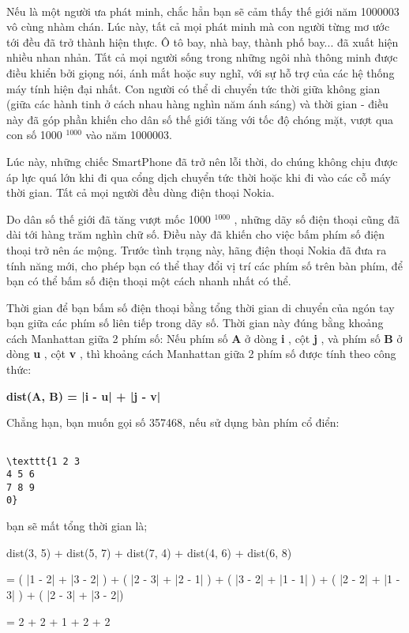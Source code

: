  

Nếu là một người ưa phát minh, chắc hẳn bạn sẽ cảm thấy thế giới năm 1000003 vô cùng nhàm chán. Lúc này, tất cả mọi phát minh mà con người từng mơ ước tới đều đã trở thành hiện thực. Ô tô bay, nhà bay, thành phố bay... đã xuất hiện nhiều nhan nhản. Tất cả mọi người sống trong những ngôi nhà thông minh được điều khiển bởi giọng nói, ánh mắt hoặc suy nghĩ, với sự hỗ trợ của các hệ thống máy tính hiện đại nhất. Con người có thể di chuyển tức thời giữa không gian (giữa các hành tinh ở cách nhau hàng nghìn năm ánh sáng) và thời gian - điều này đã góp phần khiến cho dân số thế giới tăng với tốc độ chóng mặt, vượt qua con số 1000 $^ 1000 $ vào năm 1000003.

Lúc này, những chiếc SmartPhone đã trở nên lỗi thời, do chúng không chịu được áp lực quá lớn khi đi qua cổng dịch chuyển tức thời hoặc khi đi vào các cỗ máy thời gian. Tất cả mọi người đều dùng điện thoại Nokia.

Do dân số thế giới đã tăng vượt mốc 1000 $^ 1000 $ , những dãy số điện thoại cũng đã dài tới hàng trăm nghìn chữ số. Điều này đã khiến cho việc bấm phím số điện thoại trở nên ác mộng. Trước tình trạng này, hãng điện thoại Nokia đã đưa ra tính năng mới, cho phép bạn có thể thay đổi vị trí các phím số trên bàn phím, để bạn có thể bấm số điện thoại một cách nhanh nhất có thể.

Thời gian để bạn bấm số điện thoại bằng tổng thời gian di chuyển của ngón tay bạn giữa các phím số liên tiếp trong dãy số. Thời gian này đúng bằng khoảng cách Manhattan giữa 2 phím số: Nếu phím số \textbf{ A } ở dòng \textbf{ i } , cột \textbf{ j } , và phím số \textbf{ B } ở dòng \textbf{ u } , cột \textbf{ v } , thì khoảng cách Manhattan giữa 2 phím số được tính theo công thức:

\textbf{dist(A, B) = |i - u| + |j - v| }

Chẳng hạn, bạn muốn gọi số 357468, nếu sử dụng bàn phím cổ điển:
\begin{verbatim}

\texttt{1 2 3
4 5 6
7 8 9
0}\end{verbatim}

bạn sẽ mất tổng thời gian là;

dist(3, 5) + dist(5, 7) + dist(7, 4) + dist(4, 6) + dist(6, 8)

= ( |1 - 2| + |3 - 2| ) + ( |2 - 3| + |2 - 1| ) + ( |3 - 2| + |1 - 1| ) + ( |2 - 2| + |1 - 3| ) + ( |2 - 3| + |3 - 2|)

= 2 + 2 + 1 + 2 + 2

